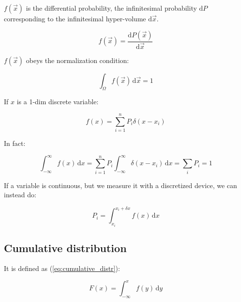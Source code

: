 $f(\vec{x})$ is the differential probability, \ie the infinitesimal probability $\mathrm{d}P$ corresponding to the infinitesimal hyper-volume $\mathrm{d}\vec{x}$.

\begin{equation}\label{eq:differential_prob}
	f(\vec{x}) = \frac{\mathrm{d}P(\vec{x})}{\mathrm{d}\vec{x}}
\end{equation}

$f(\vec{x})$ obeys the normalization condition:

\begin{equation}\label{eq:differential_norm_cond}
	\int_{\Omega} {f(\vec{x})} \,\mathrm{d}\vec{x} = 1
\end{equation}

If $x$ is a 1-dim discrete variable:

\begin{equation}\label{eq:discrete_differential_prob}
	f(x) = \sum_{i = 1}^{n}{P_{i} \delta(x - x_{i})}
\end{equation}

In fact:

\begin{equation}
	\int_{-\infty}^\infty f(x) \,\mathrm{d}x = \sum_{i = 1}^{n}{P_{i} \int_{-\infty}^\infty \delta(x - x_{i}) \,\mathrm{d}x} = \sum_{i} P_{i} = 1
\end{equation}

If a variable is continuous, but we measure it with a discretized device, we can instead do:


\begin{equation}
	P_{i} = \int_{x_{i}}^{x_{i} + \delta x} f(x) \,\mathrm{d}x
\end{equation}

\subsection{Cumulative distribution}
\label{subsec:cdf}


It is defined as (\ref{eq:cumulative_distr}):

\begin{equation}\label{eq:cumulative_distr}
	F(x) = \int_{-\infty}^{x} f(y) \,\mathrm{d}y
\end{equation}

